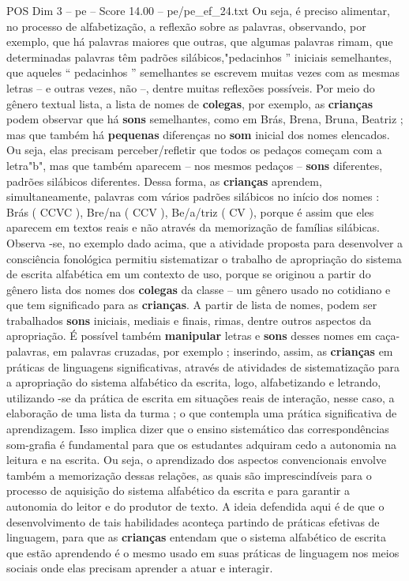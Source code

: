 \begin{textsample}{POS Dim 3 – pe – Score 14.00 – pe/pe\_ef\_24.txt}
Ou seja, é preciso alimentar, no processo de alfabetização, a reflexão sobre as palavras, observando, por exemplo, que há palavras maiores que outras, que algumas palavras rimam, que determinadas palavras têm padrões silábicos,"pedacinhos ” iniciais semelhantes, que aqueles “ pedacinhos ” semelhantes se escrevem muitas vezes com as mesmas letras – e outras vezes, não –, dentre muitas reflexões possíveis.
Por meio do gênero textual lista, a lista de nomes de \textbf{colegas}, por exemplo, as \textbf{crianças} podem observar que há \textbf{sons} semelhantes, como em Brás, Brena, Bruna, Beatriz ; mas que também há \textbf{pequenas} diferenças no \textbf{som} inicial dos nomes elencados.
Ou seja, elas precisam perceber/refletir que todos os pedaços começam com a letra"b", mas que também aparecem – nos mesmos pedaços – \textbf{sons} diferentes, padrões silábicos diferentes.
Dessa forma, as \textbf{crianças} aprendem, simultaneamente, palavras com vários padrões silábicos no início dos nomes : Brás ( CCVC ), Bre/na ( CCV ), Be/a/triz ( CV ), porque é assim que eles aparecem em textos reais e não através da memorização de famílias silábicas.
Observa -se, no exemplo dado acima, que a atividade proposta para desenvolver a consciência fonológica permitiu sistematizar o trabalho de apropriação do sistema de escrita alfabética em um contexto de uso, porque se originou a partir do gênero lista dos nomes dos \textbf{colegas} da classe – um gênero usado no cotidiano e que tem significado para as \textbf{crianças}.
A partir de lista de nomes, podem ser trabalhados \textbf{sons} iniciais, mediais e finais, rimas, dentre outros aspectos da apropriação.
É possível também \textbf{manipular} letras e \textbf{sons} desses nomes em caça-palavras, em palavras cruzadas, por exemplo ; inserindo, assim, as \textbf{crianças} em práticas de linguagens significativas, através de atividades de sistematização para a apropriação do sistema alfabético da escrita, logo, alfabetizando e letrando, utilizando -se da prática de escrita em situações reais de interação, nesse caso, a elaboração de uma lista da turma ; o que contempla uma prática significativa de aprendizagem.
Isso implica dizer que o ensino sistemático das correspondências som-grafia é fundamental para que os estudantes adquiram cedo a autonomia na leitura e na escrita.
Ou seja, o aprendizado dos aspectos convencionais envolve também a memorização dessas relações, as quais são imprescindíveis para o processo de aquisição do sistema alfabético da escrita e para garantir a autonomia do leitor e do produtor de texto.
A ideia defendida aqui é de que o desenvolvimento de tais habilidades aconteça partindo de práticas efetivas de linguagem, para que as \textbf{crianças} entendam que o sistema alfabético de escrita que estão aprendendo é o mesmo usado em suas práticas de linguagem nos meios sociais onde elas precisam aprender a atuar e interagir.

\end{textsample}
